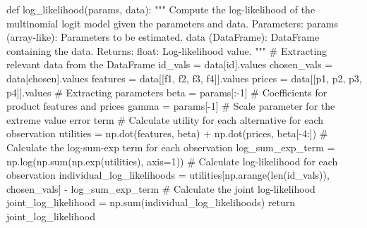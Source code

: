 \documentclass[
  letterpaper,
  DIV=11,
  numbers=noendperiod]{scrartcl}
\newenvironment{Shaded}{\begin{snugshade}}{\end{snugshade}}
\newcommand{\CommentTok}[1]{\textcolor[rgb]{0.37,0.37,0.37}{#1}}
\begin{document}
\begin{Shaded}
\begin{Highlighting}[]
\CommentTok{\textquotesingle{}\textquotesingle{}\textquotesingle{}}
\CommentTok{def log\_likelihood(params, data):}
\CommentTok{    """}
\CommentTok{    Compute the log{-}likelihood of the multinomial logit model given the parameters and data.}
\CommentTok{    }
\CommentTok{    Parameters:}
\CommentTok{        params (array{-}like): Parameters to be estimated.}
\CommentTok{        data (DataFrame): DataFrame containing the data.}
\CommentTok{        }
\CommentTok{    Returns:}
\CommentTok{        float: Log{-}likelihood value.}
\CommentTok{    """}
\CommentTok{    \# Extracting relevant data from the DataFrame}
\CommentTok{    id\_vals = data[\textquotesingle{}id\textquotesingle{}].values}
\CommentTok{    chosen\_vals = data[\textquotesingle{}chosen\textquotesingle{}].values}
\CommentTok{    features = data[[\textquotesingle{}f1\textquotesingle{}, \textquotesingle{}f2\textquotesingle{}, \textquotesingle{}f3\textquotesingle{}, \textquotesingle{}f4\textquotesingle{}]].values}
\CommentTok{    prices = data[[\textquotesingle{}p1\textquotesingle{}, \textquotesingle{}p2\textquotesingle{}, \textquotesingle{}p3\textquotesingle{}, \textquotesingle{}p4\textquotesingle{}]].values}
\CommentTok{    }
\CommentTok{    \# Extracting parameters}
\CommentTok{    beta = params[:{-}1]  \# Coefficients for product features and prices}
\CommentTok{    gamma = params[{-}1]   \# Scale parameter for the extreme value error term}
\CommentTok{    }
\CommentTok{    \# Calculate utility for each alternative for each observation}
\CommentTok{    utilities = np.dot(features, beta) + np.dot(prices, beta[{-}4:])}
\CommentTok{    }
\CommentTok{    \# Calculate the log{-}sum{-}exp term for each observation}
\CommentTok{    log\_sum\_exp\_term = np.log(np.sum(np.exp(utilities), axis=1))}
\CommentTok{    }
\CommentTok{    \# Calculate log{-}likelihood for each observation}
\CommentTok{    individual\_log\_likelihoods = utilities[np.arange(len(id\_vals)), chosen\_vals] {-} log\_sum\_exp\_term}
\CommentTok{    }
\CommentTok{    \# Calculate the joint log{-}likelihood}
\CommentTok{    joint\_log\_likelihood = np.sum(individual\_log\_likelihoods)}
\CommentTok{    }
\CommentTok{    return joint\_log\_likelihood\textquotesingle{}\textquotesingle{}\textquotesingle{}}
\end{Highlighting}
\end{Shaded}
\end{document}
